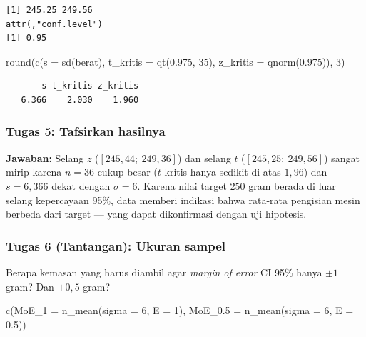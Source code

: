 \documentclass[
  indonesian,
  letterpaper,
]{book}
\newenvironment{Shaded}{\begin{snugshade}}{\end{snugshade}}
\newcommand{\AttributeTok}[1]{\textcolor[rgb]{0.40,0.45,0.13}{#1}}
\newcommand{\DecValTok}[1]{\textcolor[rgb]{0.68,0.00,0.00}{#1}}
\newcommand{\FloatTok}[1]{\textcolor[rgb]{0.68,0.00,0.00}{#1}}
\newcommand{\FunctionTok}[1]{\textcolor[rgb]{0.28,0.35,0.67}{#1}}
\newcommand{\NormalTok}[1]{\textcolor[rgb]{0.00,0.23,0.31}{#1}}
\begin{document}
\begin{verbatim}
[1] 245.25 249.56
attr(,"conf.level")
[1] 0.95
\end{verbatim}

\begin{Shaded}
\begin{Highlighting}[]
\FunctionTok{round}\NormalTok{(}\FunctionTok{c}\NormalTok{(}\AttributeTok{s =} \FunctionTok{sd}\NormalTok{(berat), }\AttributeTok{t\_kritis =} \FunctionTok{qt}\NormalTok{(}\FloatTok{0.975}\NormalTok{, }\DecValTok{35}\NormalTok{), }\AttributeTok{z\_kritis =} \FunctionTok{qnorm}\NormalTok{(}\FloatTok{0.975}\NormalTok{)), }\DecValTok{3}\NormalTok{)}
\end{Highlighting}
\end{Shaded}

\begin{verbatim}
       s t_kritis z_kritis 
   6.366    2.030    1.960 
\end{verbatim}

\subsubsection{Tugas 5: Tafsirkan
hasilnya}\label{tugas-5-tafsirkan-hasilnya}

\textbf{Jawaban:} Selang \(z\) (\([245{,}44;\ 249{,}36]\)) dan selang
\(t\) (\([245{,}25;\ 249{,}56]\)) sangat mirip karena \(n = 36\) cukup
besar (\(t\) kritis hanya sedikit di atas \(1{,}96\)) dan
\(s = 6{,}366\) dekat dengan \(\sigma = 6\). Karena nilai target \(250\)
gram berada di luar selang kepercayaan 95\%, data memberi indikasi bahwa
rata-rata pengisian mesin berbeda dari target --- yang dapat
dikonfirmasi dengan uji hipotesis.

\subsubsection{Tugas 6 (Tantangan): Ukuran
sampel}\label{tugas-6-tantangan-ukuran-sampel}

Berapa kemasan yang harus diambil agar \emph{margin of error} CI 95\%
hanya \(\pm 1\) gram? Dan \(\pm 0{,}5\) gram?

\begin{Shaded}
\begin{Highlighting}[]
\FunctionTok{c}\NormalTok{(}\AttributeTok{MoE\_1 =} \FunctionTok{n\_mean}\NormalTok{(}\AttributeTok{sigma =} \DecValTok{6}\NormalTok{, }\AttributeTok{E =} \DecValTok{1}\NormalTok{),}
  \AttributeTok{MoE\_0.5 =} \FunctionTok{n\_mean}\NormalTok{(}\AttributeTok{sigma =} \DecValTok{6}\NormalTok{, }\AttributeTok{E =} \FloatTok{0.5}\NormalTok{))}
\end{Highlighting}
\end{Shaded}
\end{document}

